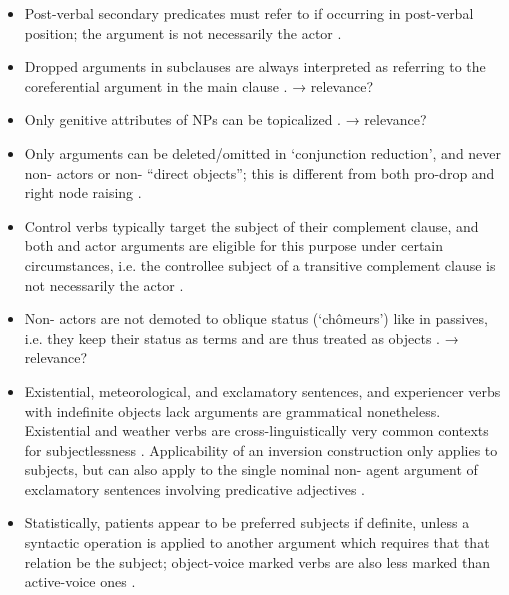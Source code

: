 \begin{itemize}
\begin{itemize}
		\item Post-verbal secondary predicates must refer to \Nom{} if
		occurring in post-verbal position; the \Nom{} argument is not
		necessarily the actor \citep[29--30]{kroeger1991}.

		\item Dropped \Nom{} arguments in subclauses are always interpreted as
		referring to the coreferential \Nom{} argument in the main clause
		\citep[30--31]{kroeger1991}. → relevance?

		\item Only genitive attributes of \Nom{} NPs can be topicalized
		\citep[31]{kroeger1991}. → relevance?

		\item Only \Nom{} arguments can be deleted/omitted in `conjunction
		reduction', and never non-\Nom{} actors or non-\Nom{} ``direct
		objects''; this is different from both pro-drop and right node raising
		\citep[32-34]{kroeger1991}.

		\item Control verbs typically target the subject of their complement
		clause, and both \Nom{} and actor arguments are eligible for this
		purpose under certain circumstances, i.e. the controllee subject of a
		transitive complement clause is not necessarily the actor
		\citep[36--38]{kroeger1991}.

		\item Non-\Nom{} actors are not demoted to oblique status (`chômeurs')
		like in passives, i.e. they keep their status as terms and are thus
		treated as objects \citep[38\psqq]{kroeger1991}. → relevance?

		\item Existential, meteorological, and exclamatory sentences, and
		experiencer verbs with indefinite objects lack \Nom{} arguments are
		grammatical nonetheless. Existential and weather verbs are
		cross-linguistically very common contexts for subjectlessness
		\citep[46--49]{kroeger1991}. Applicability of an inversion construction
		only applies to subjects, but can also apply to the single nominal
		non-\Nom{} agent argument of exclamatory sentences involving
		predicative adjectives \cite[50]{kroeger1991}.

		\item Statistically, patients appear to be preferred subjects if
		definite, unless a syntactic operation is applied to another argument
		which requires that that relation be the subject; object-voice marked
		verbs are also less marked than active-voice ones
		\citep[53]{kroeger1991}.


\end{itemize}
\end{itemize}
